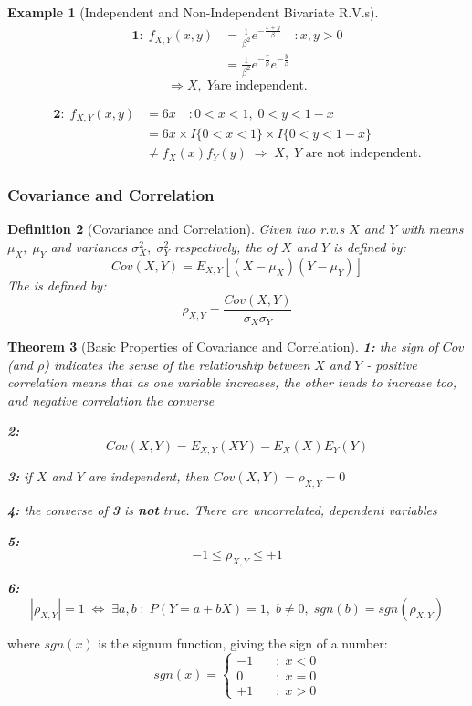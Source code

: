 \documentclass[12pt,a4paper]{article}
\newtheorem{thm}{Theorem}[subsection]
\newtheorem{defn}[thm]{Definition}
\newtheorem{ex}[thm]{Example}
\newcommand{\uline}[1]{\underline{\smash{#1}}}
\begin{document}
\begin{ex}[Independent and Non-Independent Bivariate R.V.s]

\begin{align*}
\mathbf{1\!: }\; f_{X,Y}(x,y) &= \frac{1}{\beta^2}e^{-\frac{x+y}{\beta}}\quad : x,y>0\\
&= \frac{1}{\beta^2}e^{-\frac{x}{\beta}}e^{-\frac{y}{\beta}}
\end{align*}
$$\Rightarrow X,\;Y \text{are independent.}$$

\begin{align*}
\mathbf{2\!: }\; f_{X,Y}(x,y) &= 6x\quad : 0<x<1,\; 0<y<1-x\\
&= 6x \times I\{0<x<1\} \times I\{0<y<1-x\}\\
&\neq f_X(x)f_Y(y)\; \Rightarrow\; X,\; Y \text{ are not independent.}
\end{align*}

\end{ex}

\subsubsection{Covariance and Correlation}

\begin{defn}[Covariance and Correlation]\vspace{1cm}

Given two r.v.s $X$ and $Y$ with means $\mu_X,\; \mu_Y$ and variances $\sigma_X^2,\; \sigma_Y^2$ respectively, the \uline{covariance} of $X$ and $Y$ is defined by:
$$Cov(X,Y) = E_{X,Y}[(X-\mu_X)(Y-\mu_Y)]$$
The \uline{correlation} is defined by:
$$\rho_{X,Y} = \frac{Cov(X,Y)}{\sigma_X \sigma_Y}$$
\end{defn}

\begin{thm}[Basic Properties of Covariance and Correlation]\vspace{1cm}

\noindent\textbf{1: } the sign of $Cov$ (and $\rho$) indicates the sense of the relationship between $X$ and $Y$ - positive correlation means that as one variable increases, the other tends to increase too, and negative correlation the converse

\noindent\textbf{2: } $$Cov(X,Y) = E_{X,Y}(XY) - E_{X}(X)E_{Y}(Y)$$

\noindent\textbf{3: } if $X$ and $Y$ are independent, then $Cov(X,Y) = \rho_{X,Y} = 0$

\noindent\textbf{4: } the converse of \textbf{3} is \textbf{not} true. There are uncorrelated, dependent variables

\noindent\textbf{5: } $$-1 \leq \rho_{X,Y} \leq +1$$

\noindent\textbf{6: } $$|\rho_{X,Y}| = 1 \; \Leftrightarrow\; \exists a,b \; : \; P(Y=a+bX) = 1,\; b\neq 0,\; sgn(b) = sgn(\rho_{X,Y})$$
\end{thm}
where $sgn(x)$ is the signum function, giving the sign of a number:
$$sgn(x) = \left\{\begin{array}{cl} -1\quad& : \; x<0\\ 0\quad& : \; x=0\\ +1\quad& :\; x >0\end{array}\right.$$
\end{document}
